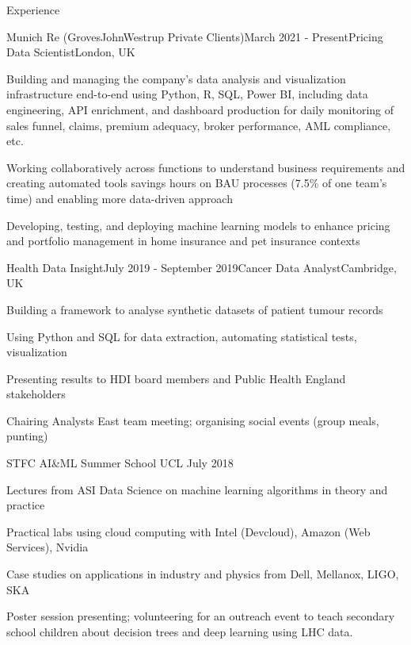 \documentclass{resume} %
\begin{document}
\begin{rSection}{Experience}
	
\begin{rSubsection}{Munich Re (GrovesJohnWestrup Private Clients)}{March 2021 - Present}{Pricing Data Scientist}{London, UK}
	\item Building and managing the company's data analysis and visualization infrastructure end-to-end using Python, R, SQL, Power BI, including data engineering, API enrichment, and dashboard production for daily monitoring of sales funnel, claims, premium adequacy, broker performance, AML compliance, etc.
	\item Working collaboratively across functions to understand business requirements and creating automated tools savings hours on BAU processes (7.5\% of one team's time) and enabling more data-driven approach
	\item Developing, testing, and deploying machine learning models to enhance pricing and portfolio management in home insurance and pet insurance contexts
\end{rSubsection}


\begin{rSubsection}{Health Data Insight}{July 2019 - September 2019}{Cancer Data Analyst}{Cambridge, UK}
\item Building a framework to analyse synthetic datasets of patient tumour records
\item Using Python and SQL for data extraction, automating statistical tests, visualization
\item Presenting results to HDI board members and Public Health England stakeholders
\item Chairing Analysts East team meeting; organising social events (group meals, punting)
\end{rSubsection}


\begin{rSubsection}{STFC AI\&ML Summer School UCL
}{July 2018}{}{}
\item Lectures from ASI Data Science on machine learning algorithms in theory and practice
\item Practical labs using cloud computing with Intel (Devcloud), Amazon (Web Services), Nvidia
\item Case studies on applications in industry and physics from Dell, Mellanox, LIGO, SKA
\item Poster session presenting; volunteering for an outreach event to teach secondary school children about decision trees and deep learning using LHC data.
\end{rSubsection}


\end{rSection}
\end{document}
